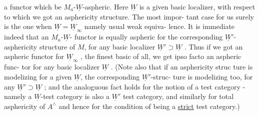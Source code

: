 
a functor which be $M_a$-$\underline{W}$-aspheric.  Here $\underline{W}$  is a given basic localizer,
with respect to which we got an asphericity structure.  The most impor-%
tant case for us surely is the one when $\underline{W}=\underline{W}_\infty$ namely usual weak equiva-%
lence.  It is immediate indeed that an $M_a$-$\underline{W}$- functor is equally 
aspheric for the corresponding $\underline{W}'$-asphericity structure of $M$,  for any
basic localizer $\underline{W}'\supset\underline{W}$ .  Thus if we got an aspheric functor for $\underline{W}_\infty$ ,
the finest basic  of all,  we get ipso facto an aspheric func-%
tor for any basic localizer $\underline{W}$ .  (Note also that if an asphericity struc
ture is modelizing for a given $\underline{W}$,   the corresponding $\underline{W}'$-struc-%
ture is modelizing too,  for any $\underline{W}'\supset\underline{W}$ ;  and the analoguous fact holds
for the notion of a test category  -  namely a $\underline{W}$-test category is also
a $\underline{W}'$ test category, and similarly for  total asphericity of $A^\wedge$ and
hence for the condition of being a \uline{strict} test category.)

